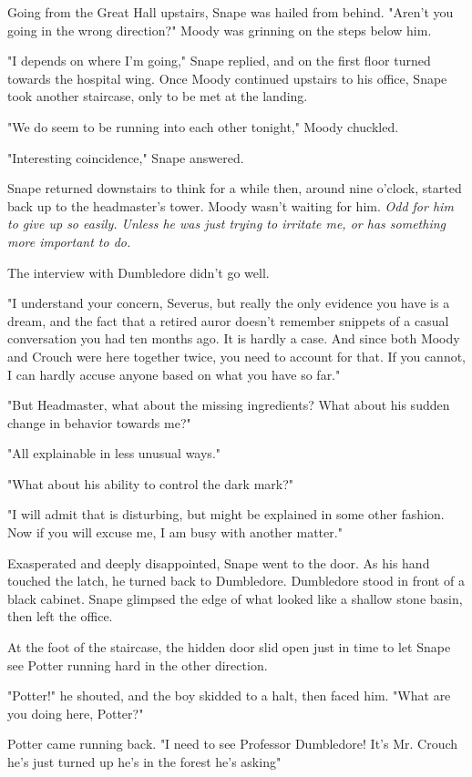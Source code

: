 Going from the Great Hall upstairs, Snape was hailed from behind. "Aren't you going in the wrong direction?" Moody was grinning on the steps below him.

"I depends on where I'm going," Snape replied, and on the first floor turned towards the hospital wing. Once Moody continued upstairs to his office, Snape took another staircase, only to be met at the landing.

"We do seem to be running into each other tonight," Moody chuckled.

"Interesting coincidence," Snape answered.

Snape returned downstairs to think for a while then, around nine o'clock, started back up to the headmaster's tower. Moody wasn't waiting for him. \emph{Odd for him to give up so easily. Unless he was just trying to irritate me, or has something more important to do.}

The interview with Dumbledore didn't go well.

"I understand your concern, Severus, but really the only evidence you have is a dream, and the fact that a retired auror doesn't remember snippets of a casual conversation you had ten months ago. It is hardly a case. And since both Moody and Crouch were here together twice, you need to account for that. If you cannot, I can hardly accuse anyone based on what you have so far."

"But Headmaster, what about the missing ingredients? What about his sudden change in behavior towards me?"

"All explainable in less{\el} unusual ways."

"What about his ability to control the dark mark?"

"I will admit that is disturbing, but might be explained in some other fashion. Now if you will excuse me, I am busy with another matter."

Exasperated and deeply disappointed, Snape went to the door. As his hand touched the latch, he turned back to Dumbledore. Dumbledore stood in front of a black cabinet. Snape glimpsed the edge of what looked like a shallow stone basin, then left the office.

At the foot of the staircase, the hidden door slid open just in time to let Snape see Potter running hard in the other direction.

"Potter!" he shouted, and the boy skidded to a halt, then faced him. "What are you doing here, Potter?"

Potter came running back. "I need to see Professor Dumbledore! It's Mr. Crouch{\el} he's just turned up{\el} he's in the forest{\el} he's asking{\el}"

